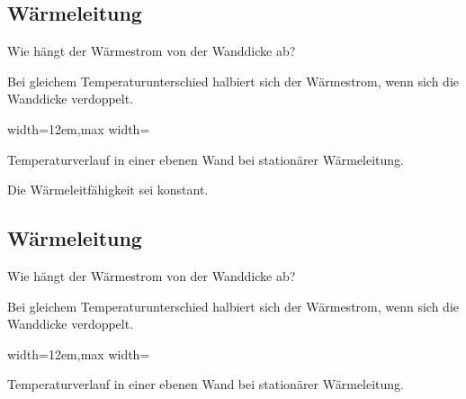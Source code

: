 \subsection{Wärmeleitung}

Wie hängt der Wärmestrom von der Wanddicke ab?

\par
Bei gleichem Temperaturunterschied halbiert sich der Wärmestrom, wenn sich die Wanddicke verdoppelt.
\par

\par
\par\begingroup\centering\noindent\begin{adjustbox}{width=12em,max width=\linewidth}


\end{adjustbox}\par
Temperaturverlauf in einer ebenen Wand bei stationärer Wärmeleitung.
\par\endgroup
\par

Die Wärmeleitfähigkeit sei konstant.

\subsection{Wärmeleitung}

Wie hängt der Wärmestrom von der Wanddicke ab?

\par
Bei gleichem Temperaturunterschied halbiert sich der Wärmestrom, wenn sich die Wanddicke verdoppelt.
\par

\par
\par\begingroup\centering\noindent\begin{adjustbox}{width=12em,max width=\linewidth}


\end{adjustbox}\par
Temperaturverlauf in einer ebenen Wand bei stationärer Wärmeleitung.
\par\endgroup
\par

